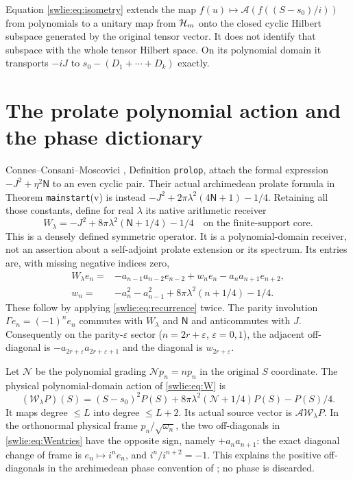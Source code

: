 Equation \eqref{swlie:eq:isometry} extends the map
$f(u)\mapsto\mathcal A(f((S-s_0)/i))$ from polynomials to
a unitary map from $\mathcal H_m$ onto the closed cyclic Hilbert
subspace generated by the original tensor vector.
It does not identify that subspace with the whole tensor
Hilbert space. On its polynomial domain it transports
$-iJ$ to $s_0-(D_1+\cdots+D_k)$ exactly.

\section{The prolate polynomial action and the phase dictionary}

Connes--Consani--Moscovici \cite{swlie:CCM}, Definition
\texttt{prolop}, attach the formal expression $-J^2+\eta^2\mathsf N$
to an even cyclic pair. Their actual archimedean prolate
formula in Theorem \texttt{mainstart}(v) is instead
$-J^2+2\pi\lambda^2(4\mathsf N+1)-1/4$.
Retaining all those constants, define for real $\lambda$
its native arithmetic receiver
\begin{equation}\label{swlie:eq:W}
 W_\lambda=-J^2+8\pi\lambda^2(\mathsf N+1/4)-1/4
 \quad\text{on the finite-support core}.
\end{equation}
This is a densely defined symmetric operator.
It is a polynomial-domain receiver, not an assertion about
a self-adjoint prolate extension or its spectrum.
Its entries are, with missing negative indices zero,
\begin{equation}\label{swlie:eq:Wentries}
 \begin{split}
 W_\lambda e_n={}&-a_{n-1}a_{n-2}e_{n-2}
  +w_ne_n-a_na_{n+1}e_{n+2},\\
 w_n={}&-a_n^2-a_{n-1}^2+8\pi\lambda^2(n+1/4)-1/4.
 \end{split}
\end{equation}
These follow by applying \eqref{swlie:eq:recurrence} twice.
The parity involution $\Gamma e_n=(-1)^ne_n$ commutes with
$W_\lambda$ and $\mathsf N$ and anticommutes with $J$.
Consequently on the parity-$\varepsilon$ sector
($n=2r+\varepsilon$, $\varepsilon=0,1$), the adjacent off-diagonal
is $-a_{2r+\varepsilon}a_{2r+\varepsilon+1}$ and the
diagonal is $w_{2r+\varepsilon}$.

Let $\mathcal N$ be the polynomial grading
$\mathcal Np_n=np_n$ in the original $S$ coordinate.
The physical polynomial-domain action of \eqref{swlie:eq:W} is
\begin{equation}\label{swlie:eq:Wphysical}
 (\mathcal W_\lambda P)(S)
 =(S-s_0)^2P(S)+8\pi\lambda^2(\mathcal N+1/4)P(S)-P(S)/4.
\end{equation}
It maps degree $\leq L$ into degree $\leq L+2$.
Its actual source vector is $\mathcal A\mathcal W_\lambda P$.
In the orthonormal physical frame $p_n/\sqrt{\omega_n}$,
the two off-diagonals in \eqref{swlie:eq:Wentries} have the opposite
sign, namely $+a_na_{n+1}$: the exact diagonal change of
frame is $e_n\mapsto i^ne_n$, and $i^{n}/i^{n+2}=-1$.
This explains the positive off-diagonals in the archimedean
phase convention of \cite{swlie:CCM}; no phase is discarded.

